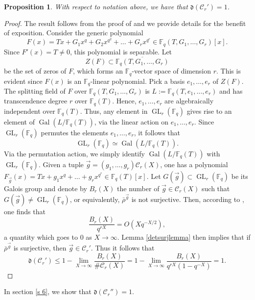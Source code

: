\documentclass[11pt]{amsart}
\newtheorem{proposition}[theorem]{Proposition}
\newcommand{\F}{\mathbb{F}}
\newcommand{\cC}{\mathcal{C}}
\newcommand{\op}[1]{\operatorname{#1}}
\numberwithin{equation}{section}
\begin{document}
\begin{proposition}\label{cc prime =1}
    With respect to notation above, we have that $\mathfrak{d}(\cC_r')=1$.
\end{proposition}
\begin{proof}
\par The result follows from the proof of \cite[Theorem 3]{Galoisadd} and we provide details for the benefit of exposition. Consider the generic polynomial
\[F(x)=Tx+G_1x^q+G_2x^{q^2}+\dots+ G_r x^{q^r}\in \F_q(T, G_1,\dots, G_r)[x].\] Since $F'(x)=T\neq 0$, this polynomial is separable. Let \[Z(F)\subset \overline{\F_q(T, G_1,\dots, G_r)}\] be the set of zeros of $F$, which forms an $\F_q$-vector space of dimension $r$. This is evident since $F(x)$ is an $\F_q$-linear polynomial. Pick a basis $e_1,\dots, e_r$ of $Z(F)$. The splitting field of $F$ over $\F_q(T, G_1,\dots, G_r)$ is $L:=\F_q(T, e_1, \dots, e_r)$ and has transcendence degree $r$ over $\F_q(T)$. Hence, $e_1, \dots, e_r$ are algebraically independent over $\F_q(T)$. Thus, any element in $\op{GL}_r(\F_q)$ gives rise to an element of $\op{Gal}(L/\F_q(T))$, via the linear action on $e_1, \dots, e_r$. Since $\op{GL}_r(\F_q)$ permutes the elements $e_1, \dots, e_r$, it follows that 
\[\op{GL}_r(\F_q)\simeq \op{Gal}(L/\F_q(T)).\] Via the permutation action, we simply identify $\op{Gal}(L/\F_q(T))$ with $\op{GL}_r(\F_q)$. Given a tuple $\vec{g}=(g_1, \dots, g_r)\mathcal{C}_r(X)$, one has a polynomial $F_{\vec{g}}(x)=Tx+g_1x^q+\dots +g_r x^{q^r}\in \F_q(T)[x]$. Let $G(\vec{g})\subset \op{GL}_r(\F_q)$ be its Galois group and denote by $B_r(X)$ the number of $\vec{g}\in \mathcal{C}_r(X)$ such that $G(\vec{g})\neq  \op{GL}_r(\F_q)$, or equivalently, $\bar{\rho}^{\vec{g}}$ is not surjective. Then, according to \cite[Corollary 3.5]{HITFF}, one finds that 
\[\frac{B_r(X)}{q^{rX}}=O(Xq^{-X/2}),\] a quantity which goes to $0$ as $X\rightarrow \infty$. Lemma \ref{detsurjlemma} then implies that if $\bar{\rho}^{\vec{g}}$ is surjective, then $\vec{g}\in \cC_r'$. Thus it follows that \[\mathfrak{d}(\cC_r')\leq 1-\lim_{X\rightarrow \infty} \frac{B_r(X)}{\#\mathcal{C}_r(X)}= 1-\lim_{X\rightarrow \infty} \frac{B_r(X)}{q^{rX}(1-q^{-X})}=1.\]
\end{proof}

In section \ref{s 6}, we show that $\mathfrak{d}(\cC_r'')=1$.
\end{document}
